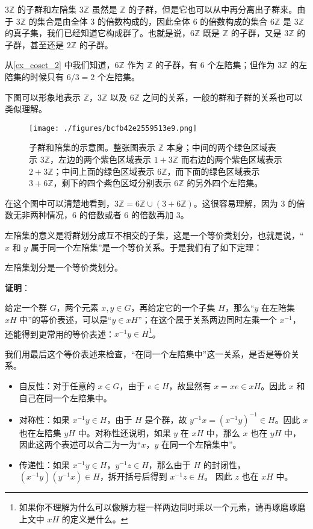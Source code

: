 \begin{example}{$3\mathbb{Z}$ 的子群和左陪集}\label{ex_coset_3}
$3\mathbb{Z}$ 虽然是 $\mathbb{Z}$ 的子群，但是它也可以从中再分离出子群来。由于 $3\mathbb{Z}$ 的集合是由全体 $3$ 的倍数构成的，因此全体 $6$ 的倍数构成的集合 $6\mathbb{Z}$ 是 $3\mathbb{Z}$ 的真子集，我们已经知道它构成群了。也就是说，$6\mathbb{Z}$ 既是 $\mathbb{Z}$ 的子群，又是 $3\mathbb{Z}$ 的子群，甚至还是 $2\mathbb{Z}$ 的子群。

从\autoref{ex_coset_2} 中我们知道，$6\mathbb{Z}$ 作为 $\mathbb{Z}$ 的子群，有 $6$ 个左陪集；但作为 $3\mathbb{Z}$ 的左陪集的时候只有 $6/3=2$ 个左陪集。

下图可以形象地表示 $\mathbb{Z}$，$3\mathbb{Z}$ 以及 $6\mathbb{Z}$ 之间的关系，一般的群和子群的关系也可以类似理解。

\begin{figure}[ht]
\centering
\texttt{[image: ./figures/bcfb42e2559513e9.png]}
\caption{子群和陪集的示意图。整张图表示 $\mathbb{Z}$ 本身；中间的两个绿色区域表示 $3\mathbb{Z}$，左边的两个紫色区域表示 $1+3\mathbb{Z}$ 而右边的两个紫色区域表示 $2+3\mathbb{Z}$；中间上面的绿色区域表示 $6\mathbb{Z}$，而下面的绿色区域表示 $3+6\mathbb{Z}$，剩下的四个紫色区域分别表示 $6\mathbb{Z}$ 的另外四个左陪集。} \label{fig_coset_1}
\end{figure}

在这个图中可以清楚地看到，$3\mathbb{Z}=6\mathbb{Z}\cup(3+6\mathbb{Z})$。这很容易理解，因为 $3$ 的倍数无非两种情况，$6$ 的倍数或者 $6$ 的倍数再加 $3$。

\end{example}

左陪集的意义是将群划分成互不相交的子集，这是一个等价类划分，也就是说，“$x$ 和 $y$ 属于同一个左陪集”是一个等价关系。于是我们有了如下定理： 

\begin{theorem}{}\label{the_coset_1}

左陪集划分是一个等价类划分。

\end{theorem}

\textbf{证明}：

给定一个群 $G$，两个元素 $x, y\in G$，再给定它的一个子集 $H$，那么“$y$ 在左陪集 $xH$ 中”的等价表述，可以是“$y\in xH$”；在这个属于关系两边同时左乘一个 $x^{-1}$，还能得到更常用的等价表述：$x^{-1}y\in H$\footnote{如果你不理解为什么可以像解方程一样两边同时乘以一个元素，请再琢磨琢磨上文中 $xH$ 的定义是什么。}。

我们用最后这个等价表述来检查，“在同一个左陪集中”这一关系，是否是等价关系。
\begin{itemize}
\item 自反性：对于任意的 $x\in G$，由于 $e\in H$，故显然有 $x=xe\in xH$。因此 $x$ 和自己在同一个左陪集中。
\item 对称性：如果 $x^{-1}y\in H$，由于 $H$ 是个群，故 $y^{-1}x=(x^{-1}y)^{-1}\in H$。因此 $x$ 也在左陪集 $yH$ 中。对称性还说明，如果 $y$ 在 $xH$ 中，那么 $x$ 也在 $yH$ 中，因此这两个表述可以合二为一为“$x$，$y$ 在同一个左陪集中”。
\item 传递性：如果 $x^{-1}y\in H$，$y^{-1}z\in H$，那么由于 $H$ 的封闭性，$(x^{-1}y)(y^{-1}x)\in H$，拆开括号后得到 $x^{-1}z\in H$。 因此 $z$ 也在 $xH$ 中。
\end{itemize}

